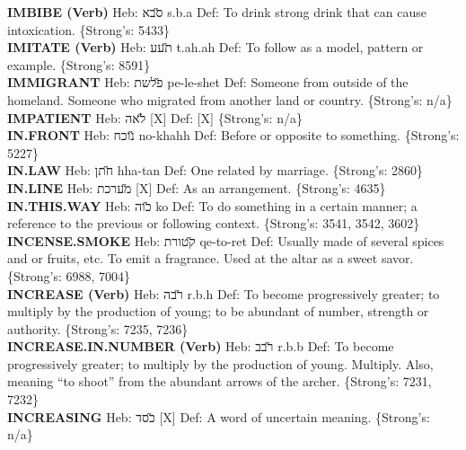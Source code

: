 {\textbf{IMBIBE (Verb)} Heb: {\large\H סבא} s.b.a Def: To drink strong drink that can cause intoxication. \{Strong's: 5433\}\hfill{}\\

\textbf{IMITATE (Verb)} Heb: {\large\H תעע} t.ah.ah Def: To follow as a model, pattern or example. \{Strong's: 8591\}\hfill{}\\

\textbf{IMMIGRANT} Heb: {\large\H פלשת} pe-le-shet Def: Someone from outside of the homeland. Someone who migrated from another land or country. \{Strong's: n/a\}\hfill{}\\

\textbf{IMPATIENT} Heb: {\large\H לאה} {[}X{]} Def: {[}X{]} \{Strong's: n/a\}\hfill{}\\

\textbf{IN.FRONT} Heb: {\large\H נוכח} no-khahh Def: Before or opposite to something. \{Strong's: 5227\}\hfill{}\\

\textbf{IN.LAW} Heb: {\large\H חתן} hha-tan Def: One related by marriage. \{Strong's: 2860\}\hfill{}\\

\textbf{IN.LINE} Heb: {\large\H מערכת} {[}X{]} Def: As an arrangement. \{Strong's: 4635\}\hfill{}\\

\textbf{IN.THIS.WAY} Heb: {\large\H כוה} ko Def: To do something in a certain manner; a reference to the previous or following context. \{Strong's: 3541, 3542, 3602\}\hfill{}\\

\textbf{INCENSE.SMOKE} Heb: {\large\H קטורת} qe-to-ret Def: Usually made of several spices and or fruits, etc. To emit a fragrance. Used at the altar as a sweet savor. \{Strong's: 6988, 7004\}\hfill{}\\

\textbf{INCREASE (Verb)} Heb: {\large\H רבה} r.b.h Def: To become progressively greater; to multiply by the production of young; to be abundant of number, strength or authority. \{Strong's: 7235, 7236\}\hfill{}\\

\textbf{INCREASE.IN.NUMBER (Verb)} Heb: {\large\H רבב} r.b.b Def: To become progressively greater; to multiply by the production of young. Multiply. Also, meaning ``to shoot'' from the abundant arrows of the archer. \{Strong's: 7231, 7232\}\hfill{}\\

\textbf{INCREASING} Heb: {\large\H כסד} {[}X{]} Def: A word of uncertain meaning. \{Strong's: n/a\}\hfill{}\\

}
